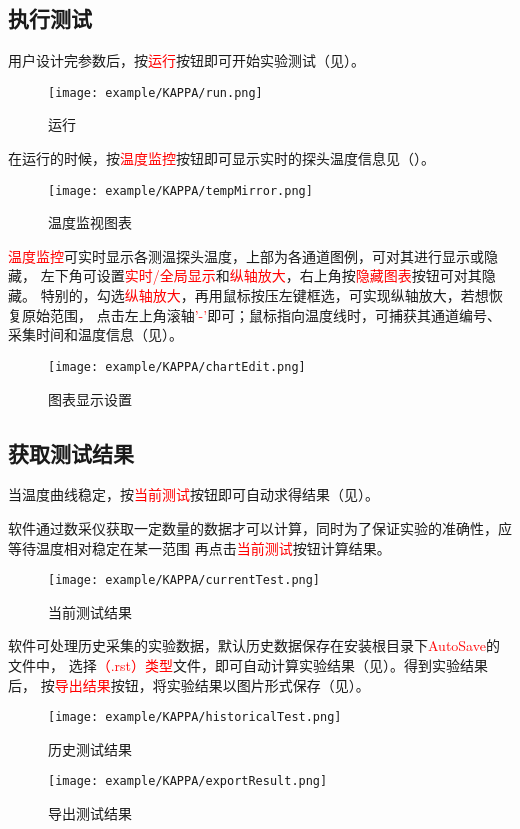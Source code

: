 \subsection{执行测试}
用户设计完参数后，按\textcolor{red}{运行}按钮即可开始实验测试（见）。
\begin{figure}[htbp]
	\centering
	\texttt{[image: example/KAPPA/run.png]}
	\caption{ 运行 \label{fig:exmp_kappa_run}}
\end{figure}
在运行的时候，按\textcolor{red}{温度监控}按钮即可显示实时的探头温度信息见（）。
\begin{figure}[htbp]
	\centering
	\texttt{[image: example/KAPPA/tempMirror.png]}
	\caption{ 温度监视图表 \label{fig:exmp_kappa_tempMirror}}
\end{figure}
\textcolor{red}{温度监控}可实时显示各测温探头温度，上部为各通道图例，可对其进行显示或隐藏，
左下角可设置\textcolor{red}{实时/全局显示}和\textcolor{red}{纵轴放大}，右上角按\textcolor{red}{隐藏图表}按钮可对其隐藏。
特别的，勾选\textcolor{red}{纵轴放大}，再用鼠标按压左键框选，可实现纵轴放大，若想恢复原始范围，
点击左上角滚轴\textcolor{red}{'-'}即可；鼠标指向温度线时，可捕获其通道编号、采集时间和温度信息（见）。\\
\begin{figure}[htbp]
	\centering
	\texttt{[image: example/KAPPA/chartEdit.png]}
	\caption{ 图表显示设置 \label{fig:exmp_kappa_chartEdit}}
\end{figure}

\subsection{获取测试结果}
	当温度曲线稳定，按\textcolor{red}{当前测试}按钮即可自动求得结果（见）。
\begin{note}
	软件通过数采仪获取一定数量的数据才可以计算，同时为了保证实验的准确性，应等待温度相对稳定在某一范围
再点击\textcolor{red}{当前测试}按钮计算结果。
\end{note}
\begin{figure}[htbp]
	\centering
	\texttt{[image: example/KAPPA/currentTest.png]}
	\caption{ 当前测试结果 \label{fig:exmp_kappa_currentTest}}
\end{figure}
软件可处理历史采集的实验数据，默认历史数据保存在安装根目录下\textcolor{red}{AutoSave}的文件中，
选择\textcolor{red}{（.rst）类型}文件，即可自动计算实验结果（见）。得到实验结果后，
按\textcolor{red}{导出结果}按钮，将实验结果以图片形式保存（见）。
\begin{figure}[htbp]
	\centering
	\texttt{[image: example/KAPPA/historicalTest.png]}
	\caption{ 历史测试结果 \label{fig:exmp_kappa_historicalTest}}
\end{figure}

\begin{figure}[htbp]
	\centering
	\texttt{[image: example/KAPPA/exportResult.png]}
	\caption{ 导出测试结果 \label{fig:exmp_kappa_exportResult}}
\end{figure}